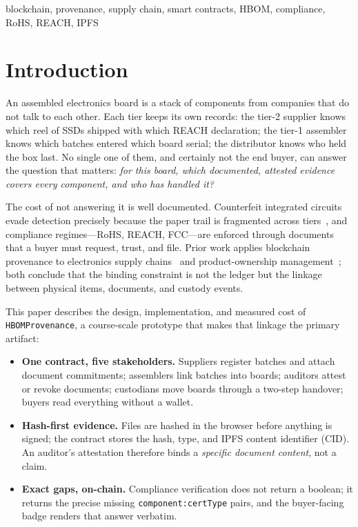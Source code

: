 \documentclass[conference]{IEEEtran}
\begin{document}
\begin{IEEEkeywords}
blockchain, provenance, supply chain, smart contracts, HBOM, compliance, RoHS, REACH, IPFS
\end{IEEEkeywords}

\section{Introduction}
An assembled electronics board is a stack of components from companies that do not talk to each other. Each tier keeps its own records: the tier-2 supplier knows which reel of SSDs shipped with which REACH declaration; the tier-1 assembler knows which batches entered which board serial; the distributor knows who held the box last. No single one of them, and certainly not the end buyer, can answer the question that matters: \emph{for this board, which documented, attested evidence covers every component, and who has handled it?}

The cost of not answering it is well documented. Counterfeit integrated circuits evade detection precisely because the paper trail is fragmented across tiers~\cite{guin}, and compliance regimes---RoHS, REACH, FCC---are enforced through documents that a buyer must request, trust, and file. Prior work applies blockchain provenance to electronics supply chains~\cite{cui} and product-ownership management~\cite{toyoda}; both conclude that the binding constraint is not the ledger but the linkage between physical items, documents, and custody events.

This paper describes the design, implementation, and measured cost of \texttt{HBOMProvenance}, a course-scale prototype that makes that linkage the primary artifact:

\begin{itemize}
\item \textbf{One contract, five stakeholders.} Suppliers register batches and attach document commitments; assemblers link batches into boards; auditors attest or revoke documents; custodians move boards through a two-step handover; buyers read everything without a wallet.
\item \textbf{Hash-first evidence.} Files are hashed in the browser before anything is signed; the contract stores the hash, type, and IPFS content identifier (CID). An auditor's attestation therefore binds a \emph{specific document content}, not a claim.
\item \textbf{Exact gaps, on-chain.} Compliance verification does not return a boolean; it returns the precise missing \texttt{component:certType} pairs, and the buyer-facing badge renders that answer verbatim.
\end{itemize}
\end{document}
